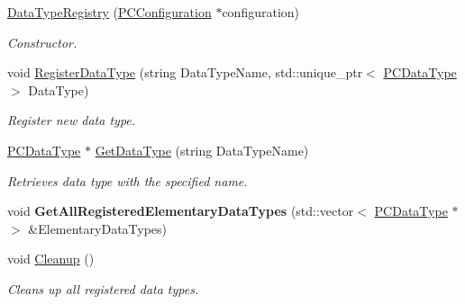 \begin{DoxyCompactItemize}
\item 
\hyperlink{classpc__emulator_1_1DataTypeRegistry_ae181a1e06e9c371b478f3f4a40aa3d05}{Data\+Type\+Registry} (\hyperlink{classpc__emulator_1_1PCConfiguration}{P\+C\+Configuration} $\ast$configuration)\hypertarget{classpc__emulator_1_1DataTypeRegistry_ae181a1e06e9c371b478f3f4a40aa3d05}{}\label{classpc__emulator_1_1DataTypeRegistry_ae181a1e06e9c371b478f3f4a40aa3d05}

\begin{DoxyCompactList}\small\item\em Constructor. \end{DoxyCompactList}\item 
void \hyperlink{classpc__emulator_1_1DataTypeRegistry_aeb42f0888bb6a866c5cb497f4c55e79d}{Register\+Data\+Type} (string Data\+Type\+Name, std\+::unique\+\_\+ptr$<$ \hyperlink{classpc__emulator_1_1PCDataType}{P\+C\+Data\+Type} $>$ Data\+Type)\hypertarget{classpc__emulator_1_1DataTypeRegistry_aeb42f0888bb6a866c5cb497f4c55e79d}{}\label{classpc__emulator_1_1DataTypeRegistry_aeb42f0888bb6a866c5cb497f4c55e79d}

\begin{DoxyCompactList}\small\item\em Register new data type. \end{DoxyCompactList}\item 
\hyperlink{classpc__emulator_1_1PCDataType}{P\+C\+Data\+Type} $\ast$ \hyperlink{classpc__emulator_1_1DataTypeRegistry_a1140ec01678f40daed5035f5e8cac6ce}{Get\+Data\+Type} (string Data\+Type\+Name)\hypertarget{classpc__emulator_1_1DataTypeRegistry_a1140ec01678f40daed5035f5e8cac6ce}{}\label{classpc__emulator_1_1DataTypeRegistry_a1140ec01678f40daed5035f5e8cac6ce}

\begin{DoxyCompactList}\small\item\em Retrieves data type with the specified name. \end{DoxyCompactList}\item 
void {\bfseries Get\+All\+Registered\+Elementary\+Data\+Types} (std\+::vector$<$ \hyperlink{classpc__emulator_1_1PCDataType}{P\+C\+Data\+Type} $\ast$ $>$ \&Elementary\+Data\+Types)\hypertarget{classpc__emulator_1_1DataTypeRegistry_a50db164fd38db1b0a45a4c4d3ce34271}{}\label{classpc__emulator_1_1DataTypeRegistry_a50db164fd38db1b0a45a4c4d3ce34271}

\item 
void \hyperlink{classpc__emulator_1_1DataTypeRegistry_ae67e87cb84212168f8784fe90d95a3dc}{Cleanup} ()\hypertarget{classpc__emulator_1_1DataTypeRegistry_ae67e87cb84212168f8784fe90d95a3dc}{}\label{classpc__emulator_1_1DataTypeRegistry_ae67e87cb84212168f8784fe90d95a3dc}

\begin{DoxyCompactList}\small\item\em Clean\textquotesingle{}s up all registered data types. \end{DoxyCompactList}\end{DoxyCompactItemize}


